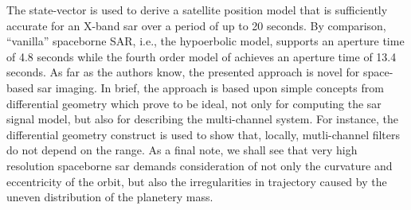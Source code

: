 \par
The state-vector is used to derive a satellite position model that is sufficiently accurate for an X-band \gls{sar} over a period of up to 20 seconds. By comparison, ``vanilla'' spaceborne SAR, i.e., the hypoerbolic model, supports an aperture time of 4.8 seconds while the fourth order model of \cite{Luo2014} achieves an aperture time of 13.4 seconds. As far as the authors know, the presented approach is novel for space-based \gls{sar} imaging. In brief, the approach is based upon simple concepts from differential geometry which prove to be ideal, not only for computing the \gls{sar} signal model, but also for describing the multi-channel system. For instance, the differential geometry construct is used to show that, locally, mutli-channel filters do not depend on the range. As a final note, we shall see that very high resolution spaceborne \gls{sar} demands consideration of not only the curvature and eccentricity of the orbit, but also the irregularities in trajectory caused by the uneven distribution of the planetery mass.
